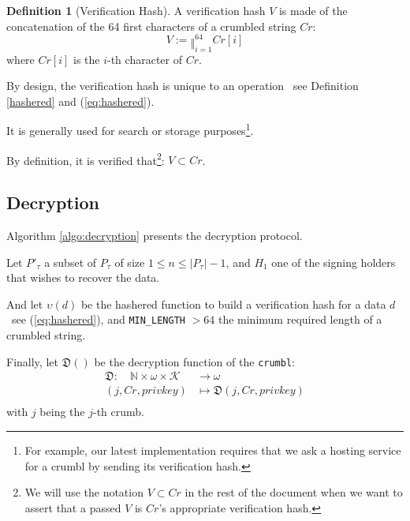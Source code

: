\documentclass[twoside,twocolumn]{article}
\theoremstyle{definition}
\newtheorem{definition}{Definition}
\theoremstyle{remark}
\begin{document}
\begin{definition}[Verification Hash]
    \label{verificationHash}
    A verification hash $V$ is made of the concatenation of the 64 first characters of a crumbled string $Cr$:
    \begin{equation}
        \label{eq:verificationHash}
        V := \mathbin\Vert_{i=1}^{64} Cr[i]
    \end{equation}
    where $Cr[i]$ is the $i$-th character of $Cr$.

    By design, the verification hash is unique to an operation \textemdash~see Definition \ref{hashered} and (\ref{eq:hashered}).

    It is generally used for search or storage purposes\footnote{For example, our latest implementation requires that we ask a hosting service for a 
    crumbl by sending its verification hash.}.

    By definition, it is verified that\footnote{We will use the notation $V \subset Cr$ in the rest of the document when we want to assert that a 
    passed $V$ is $Cr$'s appropriate verification hash.}: $V \subset Cr$.
\end{definition}

\subsection{Decryption}

Algorithm \ref{algo:decryption} presents the decryption protocol.

\vspace{1em} %

Let $P'_\tau$ a subset of $P_\tau$ of size $1 \leq n \leq |P_\tau| - 1$, and $H_1$ one of the signing holders that wishes to recover the data.

And let $\upsilon(d)$ be the hashered function to build a verification hash for a data $d$ \textemdash~see (\ref{eq:hashered}), and 
\texttt{MIN\_LENGTH} $ > 64$ the minimum required length of a crumbled string.

Finally, let $\mathfrak{D}()$ be the decryption function of the \texttt{crumbl}:
\begin{equation}
    \label{eq:decrypt}
    \begin{array}{rl}
        \mathfrak{D}: \quad \mathbb{N} \times \omega \times \mathcal{K} &\to \omega \\
                (j, Cr, privkey) &\mapsto \mathfrak{D}(j, Cr, privkey) \\
    \end{array}
\end{equation}
with $j$ being the $j$-th crumb.
\end{document}
